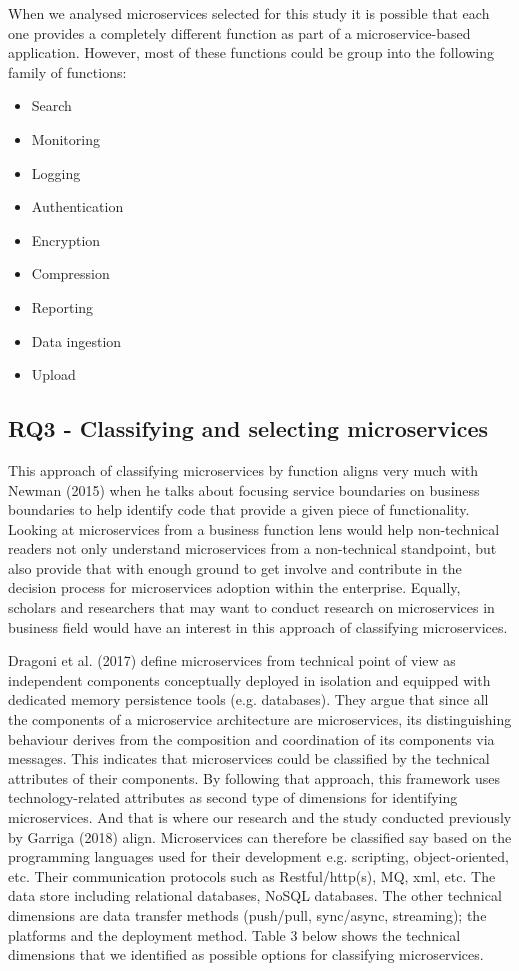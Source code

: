\documentclass{article}
\begin{document}
When we analysed microservices selected for this study it is possible that each one provides a completely different function as part of a microservice-based application. However, most of these functions could be group into the following family of functions:

\begin{itemize}


\item Search
\item Monitoring
\item Logging
\item Authentication
\item Encryption
\item Compression
\item Reporting
\item Data ingestion
\item Upload
\end{itemize}

\subsection{RQ3 - Classifying and selecting microservices}

This approach of classifying microservices by function aligns very much with Newman (2015) when he talks about focusing service boundaries on business boundaries to help identify code that provide a given piece of functionality. Looking at microservices from a business function lens would help non-technical readers not only understand microservices from a non-technical standpoint, but also provide that with enough ground to get involve and contribute in the decision process for microservices adoption within the enterprise. Equally, scholars and researchers that may want to conduct research on microservices in business field would have an interest in this approach of classifying microservices.

Dragoni et al. (2017) define microservices from technical point of view as independent components conceptually deployed in isolation and equipped with dedicated memory persistence tools (e.g. databases). They argue that since all the components of a microservice architecture are microservices, its distinguishing behaviour derives from the composition and coordination of its components via messages. This indicates that microservices could be classified by the technical attributes of their components. By following that approach, this framework uses technology-related attributes as second type of dimensions for identifying microservices. And that is where our research and the study conducted previously by Garriga (2018) align. Microservices can therefore be classified say based on the programming languages used for their development e.g. scripting, object-oriented, etc. Their communication protocols such as Restful/http(s), MQ, xml, etc. The data store including relational databases, NoSQL databases. The other technical dimensions are data transfer methods (push/pull, sync/async, streaming); the platforms and the deployment method. Table 3 below shows the technical dimensions that we identified as possible options for classifying microservices.
\end{document}
